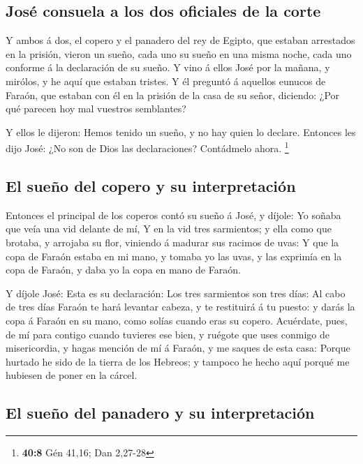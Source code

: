 \hypertarget{josuxe9-consuela-a-los-dos-oficiales-de-la-corte}{%
\subsection{José consuela a los dos oficiales de la
corte}\label{josuxe9-consuela-a-los-dos-oficiales-de-la-corte}}

 Y ambos á dos, el copero y el panadero del rey de Egipto,
que estaban arrestados en la prisión, vieron un sueño, cada uno su sueño
en una misma noche, cada uno conforme á la declaración de su sueño.
 Y vino á ellos José por la mañana, y mirólos, y he aquí que
estaban tristes.  Y él preguntó á aquellos eunucos de
Faraón, que estaban con él en la prisión de la casa de su señor,
diciendo: ¿Por qué parecen hoy mal vuestros semblantes?

 Y ellos le dijeron: Hemos tenido un sueño, y no hay quien
lo declare. Entonces les dijo José: ¿No son de Dios las declaraciones?
Contádmelo ahora. \footnote{\textbf{40:8} Gén 41,16; Dan 2,27-28}

\hypertarget{el-sueuxf1o-del-copero-y-su-interpretaciuxf3n}{%
\subsection{El sueño del copero y su
interpretación}\label{el-sueuxf1o-del-copero-y-su-interpretaciuxf3n}}

 Entonces el principal de los coperos contó su sueño á José,
y díjole: Yo soñaba que veía una vid delante de mí,  Y en
la vid tres sarmientos; y ella como que brotaba, y arrojaba su flor,
viniendo á madurar sus racimos de uvas:  Y que la copa de
Faraón estaba en mi mano, y tomaba yo las uvas, y las exprimía en la
copa de Faraón, y daba yo la copa en mano de Faraón.

 Y díjole José: Esta es su declaración: Los tres sarmientos
son tres días:  Al cabo de tres días Faraón te hará
levantar cabeza, y te restituirá á tu puesto: y darás la copa á Faraón
en su mano, como solías cuando eras su copero.  Acuérdate,
pues, de mí para contigo cuando tuvieres ese bien, y ruégote que uses
conmigo de misericordia, y hagas mención de mí á Faraón, y me saques de
esta casa:  Porque hurtado he sido de la tierra de los
Hebreos; y tampoco he hecho aquí porqué me hubiesen de poner en la
cárcel.

\hypertarget{el-sueuxf1o-del-panadero-y-su-interpretaciuxf3n}{%
\subsection{El sueño del panadero y su
interpretación}\label{el-sueuxf1o-del-panadero-y-su-interpretaciuxf3n}}

